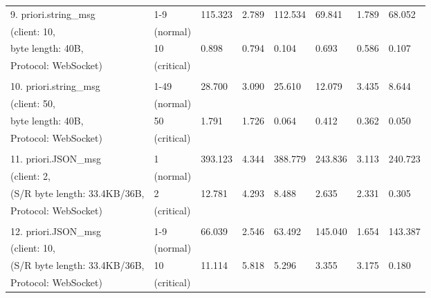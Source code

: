\begin{table}[htbp]
\begin{tabular}{m{} m{} m{} m{} m{} m{} m{} m{}}
        9. priori.string\_msg         & 1-9        & 115.323 & 2.789  & 112.534 & 69.841  & 1.789  & 68.052  \\
        (client: 10,                  & (normal)   &         &        &         &         &        &         \\
        byte length: 40B,             & 10         & 0.898   & 0.794  & 0.104   & 0.693   & 0.586  & 0.107   \\
        Protocol: WebSocket)          & (critical) &         &        &         &         &        &         \\
        & & & & & & &\\
        10. priori.string\_msg        & 1-49       & 28.700  & 3.090  & 25.610  & 12.079  & 3.435  & 8.644   \\
        (client: 50,                  & (normal)   &         &        &         &         &        &         \\
        byte length: 40B,             & 50         & 1.791   & 1.726  & 0.064   & 0.412   & 0.362  & 0.050   \\
        Protocol: WebSocket)          & (critical) &         &        &         &         &        &         \\
        & & & & & & &\\
        11. priori.JSON\_msg          & 1          & 393.123 & 4.344  & 388.779 & 243.836 & 3.113  & 240.723 \\
        (client: 2,                   & (normal)   &         &        &         &         &        &         \\
        (S/R byte length: 33.4KB/36B, & 2          & 12.781  & 4.293  & 8.488   & 2.635   & 2.331  & 0.305   \\
        Protocol: WebSocket)          & (critical) &         &        &         &         &        &         \\
        & & & & & & &\\
        12. priori.JSON\_msg          & 1-9        & 66.039  & 2.546  & 63.492  & 145.040 & 1.654  & 143.387 \\
        (client: 10,                  & (normal)   &         &        &         &         &        &         \\
        (S/R byte length: 33.4KB/36B, & 10         & 11.114  & 5.818  & 5.296   & 3.355   & 3.175  & 0.180   \\
        Protocol: WebSocket)          & (critical) &         &        &         &         &        &         \\

\end{tabular}
\end{table}
